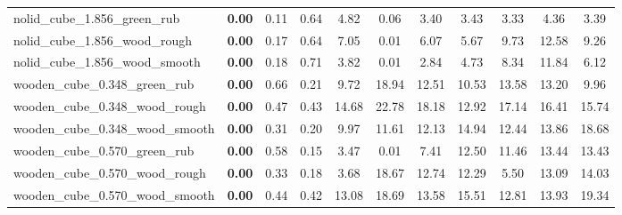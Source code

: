 \begin{table}[H]
{\begin{tabular}{l cccccccccc}
        nolid\_cube\_1.856\_green\_rub & \textbf{0.00} & 0.11 & 0.64 & 4.82 & 0.06 & 3.40 & 3.43 & 3.33 & 4.36 & 3.39 \\
        nolid\_cube\_1.856\_wood\_rough & \textbf{0.00} & 0.17 & 0.64 & 7.05 & 0.01 & 6.07 & 5.67 & 9.73 & 12.58 & 9.26 \\
        nolid\_cube\_1.856\_wood\_smooth & \textbf{0.00} & 0.18 & 0.71 & 3.82 & 0.01 & 2.84 & 4.73 & 8.34 & 11.84 & 6.12 \\
        wooden\_cube\_0.348\_green\_rub & \textbf{0.00} & 0.66 & 0.21 & 9.72 & 18.94 & 12.51 & 10.53 & 13.58 & 13.20 & 9.96 \\
        wooden\_cube\_0.348\_wood\_rough & \textbf{0.00} & 0.47 & 0.43 & 14.68 & 22.78 & 18.18 & 12.92 & 17.14 & 16.41 & 15.74 \\
        wooden\_cube\_0.348\_wood\_smooth & \textbf{0.00} & 0.31 & 0.20 & 9.97 & 11.61 & 12.13 & 14.94 & 12.44 & 13.86 & 18.68 \\
        wooden\_cube\_0.570\_green\_rub & \textbf{0.00} & 0.58 & 0.15 & 3.47 & 0.01 & 7.41 & 12.50 & 11.46 & 13.44 & 13.43 \\
        wooden\_cube\_0.570\_wood\_rough & \textbf{0.00} & 0.33 & 0.18 & 3.68 & 18.67 & 12.74 & 12.29 & 5.50 & 13.09 & 14.03 \\
        wooden\_cube\_0.570\_wood\_smooth & \textbf{0.00} & 0.44 & 0.42 & 13.08 & 18.69 & 13.58 & 15.51 & 12.81 & 13.93 & 19.34 \\
        \bottomrule
    \end{tabular}
    }
\end{table}



\vspace{1cm}

\clearpage

